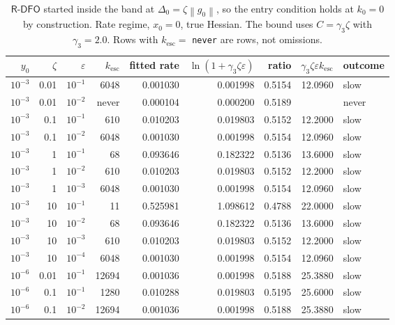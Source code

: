 \documentclass[11pt,a4paper]{article}
\providecommand{\norm}[1]{\left \lVert #1 \right \rVert}
\providecommand{\Rdfo}{\textsf{R-DFO}}
\providecommand{\gthree}{\gamma_3}
\theoremstyle{definition}
\theoremstyle{remark}
\begin{document}
\begin{table}[H]
  \centering\footnotesize
  \caption{$\Rdfo$ started inside the band at $\Delta_0 = \zeta\norm{g_0}$, so
    the entry condition holds at $k_0 = 0$ by construction. Rate regime,
    $x_0 = 0$, true Hessian. The bound uses $C = \gthree\zeta$ with
    $\gthree = 2.0$. Rows with $k_{\mathrm{esc}} = $ \texttt{never} are rows, not
    omissions.}
  \label{tab: grid dfo}
  \begin{tabular}{rrrrrrrrl}
    \toprule
    $y_0$ & $\zeta$ & $\varepsilon$ & $k_{\mathrm{esc}}$ & fitted rate
      & $\ln(1+\gthree\zeta\varepsilon)$ & ratio
      & $\gthree\zeta\varepsilon k_{\mathrm{esc}}$ & outcome \\
    \midrule
    $10^{-3}$ & 0.01 & $10^{-1}$ & 6048  & 0.001030 & 0.001998 & 0.5154 & 12.0960 & slow \\
    $10^{-3}$ & 0.01 & $10^{-2}$ & never & 0.000104 & 0.000200 & 0.5189 &         & never \\
    $10^{-3}$ & 0.1  & $10^{-1}$ & 610   & 0.010203 & 0.019803 & 0.5152 & 12.2000 & slow \\
    $10^{-3}$ & 0.1  & $10^{-2}$ & 6048  & 0.001030 & 0.001998 & 0.5154 & 12.0960 & slow \\
    $10^{-3}$ & 1    & $10^{-1}$ & 68    & 0.093646 & 0.182322 & 0.5136 & 13.6000 & slow \\
    $10^{-3}$ & 1    & $10^{-2}$ & 610   & 0.010203 & 0.019803 & 0.5152 & 12.2000 & slow \\
    $10^{-3}$ & 1    & $10^{-3}$ & 6048  & 0.001030 & 0.001998 & 0.5154 & 12.0960 & slow \\
    $10^{-3}$ & 10   & $10^{-1}$ & 11    & 0.525981 & 1.098612 & 0.4788 & 22.0000 & slow \\
    $10^{-3}$ & 10   & $10^{-2}$ & 68    & 0.093646 & 0.182322 & 0.5136 & 13.6000 & slow \\
    $10^{-3}$ & 10   & $10^{-3}$ & 610   & 0.010203 & 0.019803 & 0.5152 & 12.2000 & slow \\
    $10^{-3}$ & 10   & $10^{-4}$ & 6048  & 0.001030 & 0.001998 & 0.5154 & 12.0960 & slow \\
    \midrule
    $10^{-6}$ & 0.01 & $10^{-1}$ & 12694 & 0.001036 & 0.001998 & 0.5188 & 25.3880 & slow \\
    $10^{-6}$ & 0.1  & $10^{-1}$ & 1280  & 0.010288 & 0.019803 & 0.5195 & 25.6000 & slow \\
    $10^{-6}$ & 0.1  & $10^{-2}$ & 12694 & 0.001036 & 0.001998 & 0.5188 & 25.3880 & slow \\

\end{tabular}
\end{table}
\end{document}
